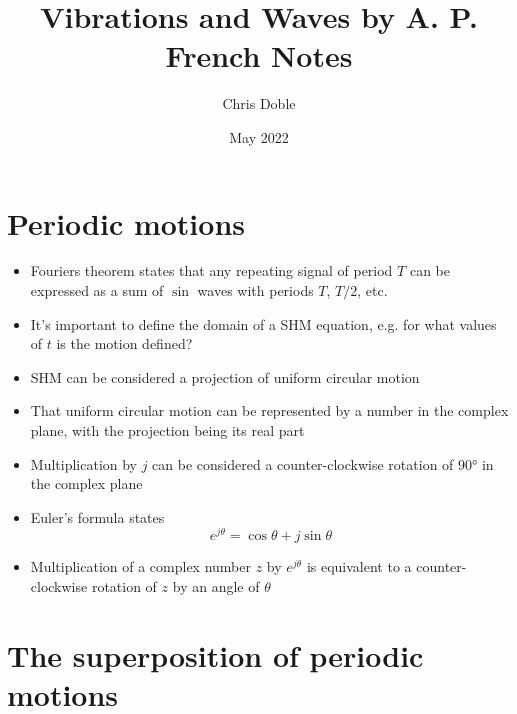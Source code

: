 \documentclass{article}
\title{Vibrations and Waves by A. P. French Notes}
\author{Chris Doble}
\date{May 2022}
\begin{document}
\maketitle

\tableofcontents

\section{Periodic motions}

\begin{itemize}
  \item Fouriers theorem states that any repeating signal of period $T$ can be expressed as a sum of $\sin$ waves with periods $T$, $T / 2$, etc.

  \item It's important to define the domain of a SHM equation, e.g. for what values of $t$ is the motion defined?

  \item SHM can be considered a projection of uniform circular motion

  \item That uniform circular motion can be represented by a number in the complex plane, with the projection being its real part

  \item Multiplication by $j$ can be considered a counter-clockwise rotation of $\ang{90}$ in the complex plane

  \item Euler's formula states \[e^{j \theta} = \cos \theta + j \sin \theta\]

  \item Multiplication of a complex number $z$ by $e^{j \theta}$ is equivalent to a counter-clockwise rotation of $z$ by an angle of $\theta$
\end{itemize}

\section{The superposition of periodic motions}
\end{document}
